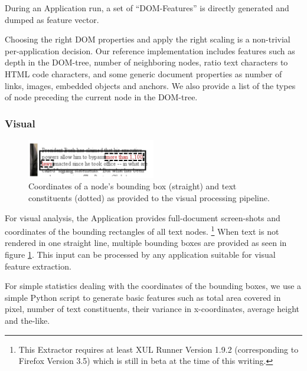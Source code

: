 During an Application run, a set of ``DOM-Features'' is directly generated and dumped as feature vector.

Choosing the right DOM properties and apply the right scaling is a non-trivial per-application decision.
Our reference implementation includes features such as depth in the DOM-tree, number of neighboring nodes, ratio text characters to HTML code characters,
  and some generic document properties as number of links, images, embedded objects and anchors.
We also provide a list of the types of node preceding the current node in the DOM-tree.


\subsubsection{Visual}

\begin{figure}
\includegraphics[width=0.5\textwidth]{vizwrap}
\caption{\label{f:vizwrap}Coordinates of a node's bounding box (straight) and text constituents (dotted) as provided to the visual processing pipeline.}
\end{figure}

For visual analysis, the Application provides full-document screen-shots and coordinates of the bounding rectangles of all text nodes.%
\footnote{This Extractor requires at least XUL Runner Version 1.9.2 (corresponding to Firefox Version 3.5) which is still in beta at the time of this writing.}
When text is not rendered in one straight line, multiple bounding boxes are provided as seen in figure \ref{f:vizwrap}.
This input can be processed by any application suitable for visual feature extraction.

For simple statistics dealing with the coordinates of the bounding boxes, we use a simple Python script to generate basic features such as total area covered in pixel, number of text constituents, their variance in x-coordinates, average height and the-like.

